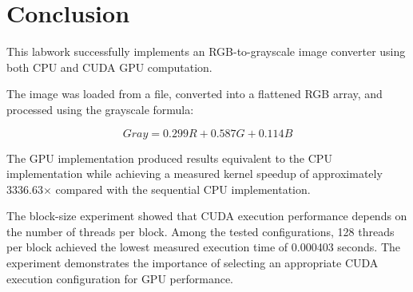 \documentclass[11pt]{article}
\begin{document}
\section{Conclusion}

This labwork successfully implements an RGB-to-grayscale image converter using both CPU and CUDA GPU computation.

The image was loaded from a file, converted into a flattened RGB array, and processed using the grayscale formula:

$$
Gray = 0.299R + 0.587G + 0.114B
$$

The GPU implementation produced results equivalent to the CPU implementation while achieving a measured kernel speedup of approximately 3336.63$\times$ compared with the sequential CPU implementation.

The block-size experiment showed that CUDA execution performance depends on the number of threads per block. Among the tested configurations, 128 threads per block achieved the lowest measured execution time of 0.000403 seconds. The experiment demonstrates the importance of selecting an appropriate CUDA execution configuration for GPU performance.
\end{document}
